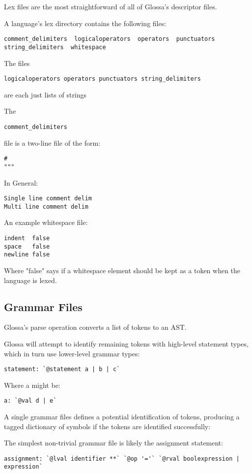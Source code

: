 \documentclass{article}
\begin{document}
Lex files are the most straightforward of all of Glossa's descriptor files.

A language's lex directory contains the following files:
\begin{verbatim}
comment_delimiters  logicaloperators  operators  punctuators  string_delimiters  whitespace
\end{verbatim}

The files 
\begin{verbatim}
logicaloperators operators punctuators string_delimiters
\end{verbatim}
are each just lists of strings

The 
\begin{verbatim}
comment_delimiters  
\end{verbatim}
file is a two-line file of the form:
\begin{verbatim}
#
""" 
\end{verbatim}
In General:
\begin{verbatim}
Single line comment delim
Multi line comment delim
\end{verbatim}

An example whitespace file:
\begin{verbatim}
indent  false
space   false
newline false
\end{verbatim}
Where "false" says if a whitespace element should be kept as a token when the language is lexed.

\subsection{Grammar Files}

Glossa's parse operation converts a list of tokens to an AST.

Glossa will attempt to identify remaining tokens with high-level statement types, which in turn use lower-level grammar types:
\begin{verbatim}
statement: `@statement a | b | c`
\end{verbatim}
Where a might be:
\begin{verbatim}
a: `@val d | e`
\end{verbatim}

A single grammar files defines a potential identification of tokens, producing a tagged dictionary of symbols if the tokens are identified successfully:

The simplest non-trivial grammar file is likely the assignment statement:
\begin{verbatim}
assignment: `@lval identifier **` `@op '='` `@rval boolexpression | expression`
\end{verbatim}
\end{document}
